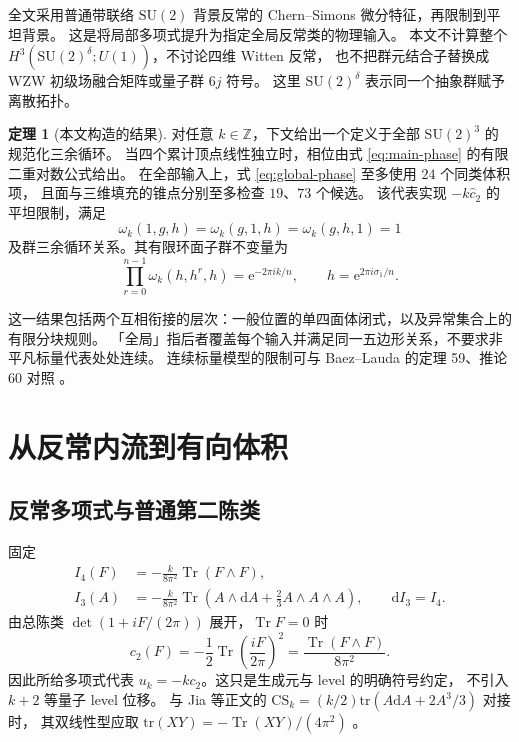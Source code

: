 \documentclass[UTF8,11pt,fontset=none]{ctexart}
\numberwithin{equation}{section}
\theoremstyle{definition}
\newtheorem{theorem}{定理}[section]
\DeclareMathOperator{\Tr}{Tr}
\newcommand{\Z}{\mathbb Z}
\newcommand{\dd}{\mathrm d}
\newcommand{\ee}{\mathrm e}
\newcommand{\SU}{\mathrm{SU}(2)}
\begin{document}
全文采用普通带联络 $\SU$ 背景反常的 Chern--Simons 微分特征，再限制到平坦背景。
这是将局部多项式提升为指定全局反常类的物理输入。
本文不计算整个 $H^3(\SU^\delta;U(1))$，不讨论四维 Witten 反常，
也不把群元结合子替换成 WZW 初级场融合矩阵或量子群 $6j$ 符号。
这里 $\SU^\delta$ 表示同一个抽象群赋予离散拓扑。

\begin{theorem}[本文构造的结果]\label{thm:main}
对任意 $k\in\Z$，下文给出一个定义于全部 $\SU^3$ 的规范化三余循环。
当四个累计顶点线性独立时，相位由式 \eqref{eq:main-phase} 的有限二重对数公式给出。
在全部输入上，式 \eqref{eq:global-phase} 至多使用 $24$ 个同类体积项，
且面与三维填充的锥点分别至多检查 $19$、$73$ 个候选。
该代表实现 $-k\widehat c_2$ 的平坦限制，满足
\[
 \omega_k(1,g,h)=\omega_k(g,1,h)=\omega_k(g,h,1)=1
\]
及群三余循环关系。其有限环面子群不变量为
\[
 \prod_{r=0}^{n-1}\omega_k(h,h^r,h)=\ee^{-2\pi ik/n},
 \qquad h=\ee^{2\pi i\sigma_1/n}.
\]
\end{theorem}

这一结果包括两个互相衔接的层次：一般位置的单四面体闭式，以及异常集合上的有限分块规则。
「全局」指后者覆盖每个输入并满足同一五边形关系，不要求非平凡标量代表处处连续。
连续标量模型的限制可与 Baez--Lauda 的定理 59、推论 60 对照 \cite{baezlauda}。

\section{从反常内流到有向体积}\label{sec:physics}

\subsection{反常多项式与普通第二陈类}

固定
\begin{align}
 I_4(F)&=-\frac{k}{8\pi^2}\Tr(F\wedge F),\label{eq:I4}\\
 I_3(A)&=-\frac{k}{8\pi^2}
 \Tr\left(A\wedge\dd A+\frac23A\wedge A\wedge A\right),
 \qquad \dd I_3=I_4.\label{eq:I3}
\end{align}
由总陈类 $\det(1+iF/(2\pi))$ 展开，$\Tr F=0$ 时
\begin{equation}
 c_2(F)=-\frac12\Tr\left(\frac{iF}{2\pi}\right)^2
 =\frac{\Tr(F\wedge F)}{8\pi^2}.
 \label{eq:c2-sign}
\end{equation}
因此所给多项式代表 $u_k=-kc_2$。这只是生成元与 level 的明确符号约定，
不引入 $k+2$ 等量子 level 位移。
与 Jia 等正文的 $\mathrm{CS}_k=(k/2)\mathrm{tr}(A\dd A+2A^3/3)$ 对接时，
其双线性型应取 $\mathrm{tr}(XY)=-\Tr(XY)/(4\pi^2)$
\cite[式 (7)--(10)、附录 E]{jia}。
\end{document}
